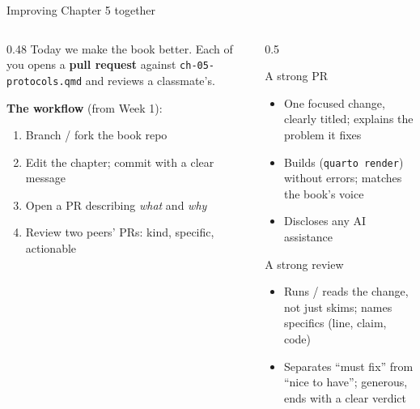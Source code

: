 \documentclass[9pt,aspectratio=169]{beamer}
\begin{document}
\begin{frame}{Improving Chapter 5 together}
    \begin{columns}[T]
        \begin{column}{0.48\textwidth}
            Today we make the book better. Each of you opens a \textbf{pull request} against \texttt{ch-05-protocols.qmd} and reviews a classmate's.

            \medskip

            \textbf{The workflow} (from Week 1):
            \begin{enumerate}\footnotesize
                \item Branch / fork the book repo
                \item Edit the chapter; commit with a clear message
                \item Open a PR describing \textit{what} and \textit{why}
                \item Review two peers' PRs: kind, specific, actionable
            \end{enumerate}
        \end{column}
        \begin{column}{0.5\textwidth}
            \begin{block}{A strong PR}
                \footnotesize
                \begin{itemize}\footnotesize
                    \item One focused change, clearly titled; explains the problem it fixes
                    \item Builds (\texttt{quarto render}) without errors; matches the book's voice
                    \item Discloses any AI assistance
                \end{itemize}
            \end{block}
            \begin{block}{A strong review}
                \footnotesize
                \begin{itemize}\footnotesize
                    \item Runs / reads the change, not just skims; names specifics (line, claim, code)
                    \item Separates ``must fix'' from ``nice to have''; generous, ends with a clear verdict
                \end{itemize}
            \end{block}
        \end{column}
    \end{columns}
\end{frame}
\end{document}
